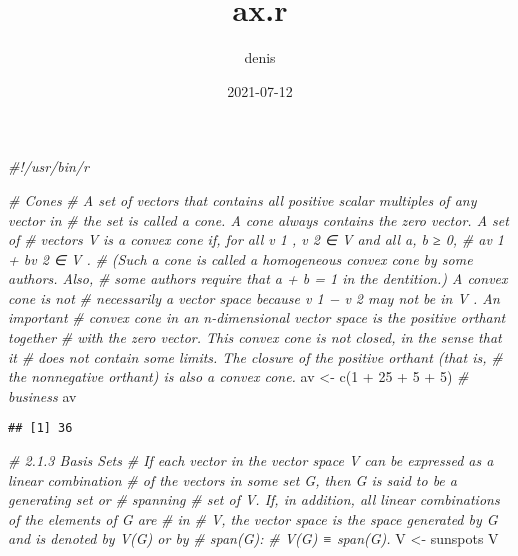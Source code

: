 \documentclass[
]{article}
\title{ax.r}
\author{denis}
\date{2021-07-12}
\newenvironment{Shaded}{\begin{snugshade}}{\end{snugshade}}
\newcommand{\CommentTok}[1]{\textcolor[rgb]{0.56,0.35,0.01}{\textit{#1}}}
\newcommand{\DecValTok}[1]{\textcolor[rgb]{0.00,0.00,0.81}{#1}}
\newcommand{\FunctionTok}[1]{\textcolor[rgb]{0.00,0.00,0.00}{#1}}
\newcommand{\NormalTok}[1]{#1}
\newcommand{\OtherTok}[1]{\textcolor[rgb]{0.56,0.35,0.01}{#1}}
\newcommand{\SpecialCharTok}[1]{\textcolor[rgb]{0.00,0.00,0.00}{#1}}
\begin{document}
\maketitle

\begin{Shaded}
\begin{Highlighting}[]
\CommentTok{\#!/usr/bin/r}

\CommentTok{\# Cones}
\CommentTok{\# A set of vectors that contains all positive scalar multiples of any vector in}
\CommentTok{\# the set is called a cone. A cone always contains the zero vector. A set of}
\CommentTok{\# vectors V is a convex cone if, for all v 1 , v 2 ∈ V and all a, b ≥ 0, }
\CommentTok{\# av 1 + bv 2 ∈ V .}
\CommentTok{\# (Such a cone is called a homogeneous convex cone by some authors. Also,}
\CommentTok{\# some authors require that a + b = 1 in the dentition.) A convex cone is not}
\CommentTok{\# necessarily a vector space because v 1 − v 2 may not be in V . An important}
\CommentTok{\# convex cone in an n{-}dimensional vector space is the positive orthant together}
\CommentTok{\# with the zero vector. This convex cone is not closed, in the sense that it}
\CommentTok{\# does not contain some limits. The closure of the positive orthant (that is, }
\CommentTok{\# the nonnegative orthant) is also a convex cone.}
\NormalTok{av }\OtherTok{\textless{}{-}} \FunctionTok{c}\NormalTok{(}\DecValTok{1} \SpecialCharTok{+} \DecValTok{25} \SpecialCharTok{+} \DecValTok{5} \SpecialCharTok{+} \DecValTok{5}\NormalTok{) }\CommentTok{\# business}
\NormalTok{av}
\end{Highlighting}
\end{Shaded}

\begin{verbatim}
## [1] 36
\end{verbatim}

\begin{Shaded}
\begin{Highlighting}[]
\CommentTok{\# 2.1.3 Basis Sets}
\CommentTok{\# If each vector in the vector space V can be expressed as a linear combination}
\CommentTok{\# of the vectors in some set G, then G is said to be a generating set or }
\CommentTok{\# spanning}
\CommentTok{\# set of V. If, in addition, all linear combinations of the elements of G are }
\CommentTok{\# in}
\CommentTok{\# V, the vector space is the space generated by G and is denoted by V(G) or by}
\CommentTok{\# span(G):}
\CommentTok{\# V(G) ≡ span(G).}
\NormalTok{V }\OtherTok{\textless{}{-}}\NormalTok{ sunspots}
\NormalTok{V}
\end{Highlighting}
\end{Shaded}
\end{document}
